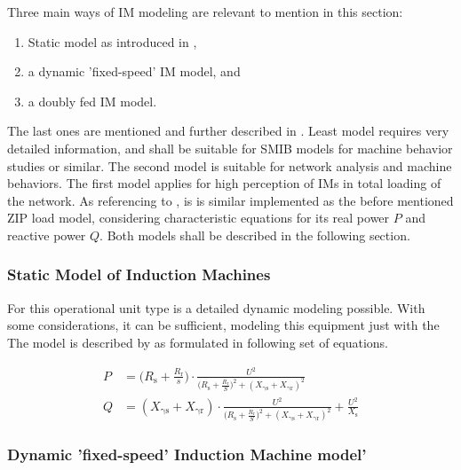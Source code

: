 Three main ways of \acs{IM} modeling are relevant to mention in this section:
\begin{enumerate}
        \item Static model as introduced in \textcite{IEEEGuideLoad2022},
        \item a dynamic 'fixed-speed' \acs{IM} model, and
        \item a doubly fed \acs{IM} model.
\end{enumerate} 
The last ones are mentioned and further described in \textcite{machowskiPowerSystemDynamics2020}. Least model requires very detailed information, and shall be suitable for \acs{SMIB} models for machine behavior studies or similar. The second model is suitable for network analysis and machine behaviors. The first model applies for high perception of \acsp{IM} in total loading of the network. As referencing to \textcite{IEEEGuideLoad2022}, is is similar implemented as the before mentioned ZIP load model, considering characteristic equations for its real power $P$ and reactive power $Q$. Both models shall be described in the following section.

\subsubsection{Static Model of Induction Machines}

For this operational unit type is a detailed dynamic modeling possible. With some considerations, it can be sufficient, modeling this equipment just with the  The model is described by \textcite{IEEEGuideLoad2022} as formulated in following set of equations. %

\begin{align}
        P&=\Bigg( R_\mathrm{s} + \frac{R_\mathrm{r}}{s} \Bigg) \cdot \frac{U^2}{\Big( R_\mathrm{s} + \frac{R_\mathrm{r}}{S} \Big)^2 + (X_\mathrm{\gamma s} + X_\mathrm{\gamma r})^2} \\[12pt]
        Q&=(X_\mathrm{\gamma s} + X_\mathrm{\gamma r}) \cdot \frac{U^2}{\Big( R_\mathrm{s} + \frac{R_\mathrm{r}}{S} \Big)^2 + (X_\mathrm{\gamma s} + X_\mathrm{\gamma r})^2} + \frac{U^2}{X_\mathrm{s}}
\end{align}



\subsubsection{Dynamic 'fixed-speed' Induction Machine model'}

